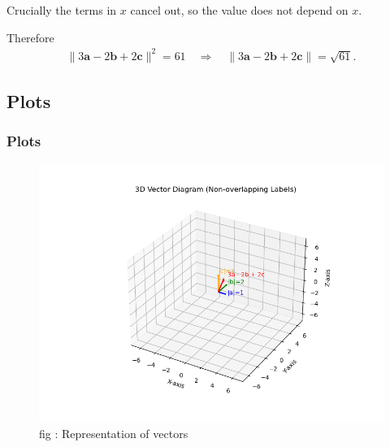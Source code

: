 \documentclass{beamer}
\theoremstyle{remark}
\let\vec\mathbf
\numberwithin{equation}{section}
\begin{document}
\begin{frame}
Crucially the terms in $x$ cancel out, so the value does not depend on $x$.

Therefore
\begin{align}
\bigl\lVert 3\vec a-2\vec b+2\vec c\bigr\rVert^2 = 61
\quad\Longrightarrow\quad
\boxed{\bigl\lVert 3\vec a-2\vec b+2\vec c\bigr\rVert=\sqrt{61}}.
\end{align}

\end{frame}

\subsection{Plots}
\begin{frame}
\frametitle{Plots}
\begin{figure}
\centering
\includegraphics[width=0.9\columnwidth]{figs/fig3.png}
\caption{fig : Representation of vectors}
\label{Fig3}
\end{figure}
\end{frame}
\end{document}

